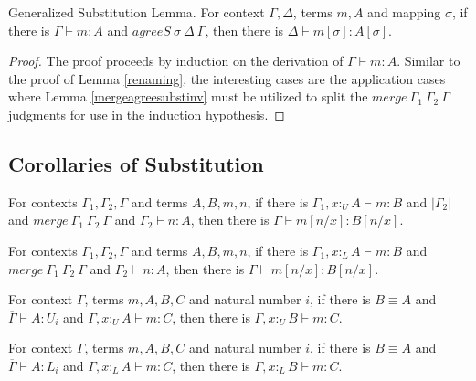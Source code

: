 \documentclass[sigplan,screen,review,anonymous]{acmart}
\newcommand{\pure}[1]{|#1|}
\newcommand{\utype}{:_{\scriptscriptstyle U}}
\newcommand{\ltype}{:_{\scriptscriptstyle L}}
\newcommand{\mrg}[3]{merge\ {#1}\ {#2}\ {#3}}
\begin{document}
\begin{lemma}
  Generalized Substitution Lemma. For context $\Gamma, \Delta$, terms $m, A$ and mapping $\sigma$, if there is $\Gamma \vdash m : A$ and $agreeS\ \sigma\ \Delta\ \Gamma$, then there is $\Delta \vdash m[\sigma] : A[\sigma]$.
\end{lemma}
\begin{proof}
  The proof proceeds by induction on the derivation of $\Gamma \vdash m : A$. Similar to the proof of Lemma \ref{renaming}, the interesting cases are the application cases where Lemma \ref{mergeagreesubstinv} must be utilized to split the $\mrg{\Gamma_1}{\Gamma_2}{\Gamma}$ judgments for use in the induction hypothesis.
\end{proof}

\subsection{Corollaries of Substitution}

\begin{corollary}\label{substitutionu}
  For contexts $\Gamma_1, \Gamma_2, \Gamma$ and terms $A, B, m, n$, if there is $\Gamma_1, x \utype A \vdash m : B$ and $\pure{\Gamma_2}$ and $\mrg{\Gamma_1}{\Gamma_2}{\Gamma}$ and $\Gamma_2 \vdash n : A$, then there is $\Gamma \vdash m[n/x]: B[n/x]$.
\end{corollary}

\begin{corollary}\label{substitutionl}
  For contexts $\Gamma_1, \Gamma_2, \Gamma$ and terms $A, B, m, n$, if there is $\Gamma_1, x \ltype A \vdash m : B$ and $\mrg{\Gamma_1}{\Gamma_2}{\Gamma}$ and $\Gamma_2 \vdash n : A$, then there is $\Gamma \vdash m[n/x]: B[n/x]$.
\end{corollary}

\begin{corollary}\label{contextconvu}
  For context $\Gamma$, terms $m, A, B, C$ and natural number $i$, if there is $B \equiv A$ and $\overline{\Gamma} \vdash A : U_i$ and $\Gamma, x \utype A \vdash m : C$, then there is $\Gamma, x \utype B \vdash m : C$.
\end{corollary}

\begin{corollary}\label{contextconvl}
  For context $\Gamma$, terms $m, A, B, C$ and natural number $i$, if there is $B \equiv A$ and $\overline{\Gamma} \vdash A : L_i$ and $\Gamma, x \ltype A \vdash m : C$, then there is $\Gamma, x \ltype B \vdash m : C$.
\end{corollary}
\end{document}
